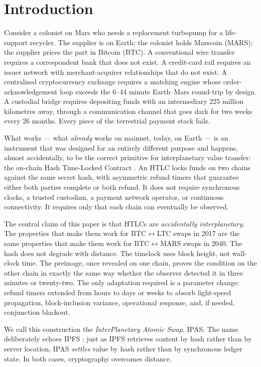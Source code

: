 \documentclass[11pt]{article}
\begin{document}
\section{Introduction}
\label{sec:intro}

Consider a colonist on Mars who needs a replacement turbopump for a life-support recycler. The supplier is on Earth; the colonist holds Marscoin (MARS); the supplier prices the part in Bitcoin (BTC). A conventional wire transfer requires a correspondent bank that does not exist. A credit-card rail requires an issuer network with merchant-acquirer relationships that do not exist. A centralised cryptocurrency exchange requires a matching engine whose order-acknowledgement loop exceeds the 6--44 minute Earth--Mars round-trip by design. A custodial bridge requires depositing funds with an intermediary 225 million kilometres away, through a communication channel that goes dark for two weeks every 26 months. Every piece of the terrestrial payment stack fails.

What works --- what \emph{already} works on mainnet, today, on Earth --- is an instrument that was designed for an entirely different purpose and happens, almost accidentally, to be the correct primitive for interplanetary value transfer: the on-chain Hash Time-Locked Contract \citep{nolan2013, todd2014cltv}. An HTLC locks funds on two chains against the same secret hash, with asymmetric refund timers that guarantee either both parties complete or both refund. It does not require synchronous clocks, a trusted custodian, a payment network operator, or continuous connectivity. It requires only that each chain can eventually be observed.

The central claim of this paper is that HTLCs are \emph{accidentally interplanetary}. The properties that make them work for BTC$\leftrightarrow$LTC swaps in 2017 are the same properties that make them work for BTC$\leftrightarrow$MARS swaps in 2040. The hash does not degrade with distance. The timelock uses block height, not wall-clock time. The preimage, once revealed on one chain, proves the condition on the other chain in exactly the same way whether the observer detected it in three minutes or twenty-two. The only adaptation required is a parameter change: refund timers extended from hours to days or weeks to absorb light-speed propagation, block-inclusion variance, operational response, and, if needed, conjunction blackout.

We call this construction the \emph{InterPlanetary Atomic Swap}, IPAS. The name deliberately echoes IPFS \citep{ipfs2014}: just as IPFS retrieves content by hash rather than by server location, IPAS \emph{settles} value by hash rather than by synchronous ledger state. In both cases, cryptography overcomes distance.
\end{document}
